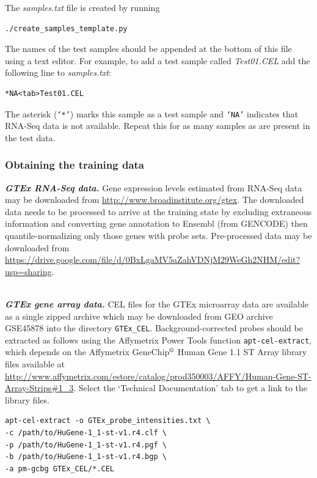 \documentclass[a4paper,12pt]{article}
\begin{document}
The \textit{samples.txt} file is created by running

\begin{verbatim}
./create_samples_template.py
\end{verbatim} 

The names of the test samples should be appended at the bottom of this file using a text editor. For example, to add a test sample called \textit{Test01.CEL} add the following line to \textit{samples.txt}:

\begin{verbatim}
*NA<tab>Test01.CEL
\end{verbatim}

The asterisk (\texttt{`*'}) marks this sample as a test sample and \texttt{`NA'} indicates that RNA-Seq data is not available. Repeat this for as many samples as are present in the test data.

\subsubsection{Obtaining the training data}
\label{usecase:training}

\textbf{\textit{GTEx RNA-Seq data.}} Gene expression levels estimated from RNA-Seq data may be downloaded from \url{http://www.broadinstitute.org/gtex}. The downloaded data needs to be processed to arrive at the training state by excluding extraneous information and converting gene annotation to Ensembl (from GENCODE) then quantile-normalizing only those genes with probe sets. Pre-processed data may be downloaded from \url{https://drive.google.com/file/d/0BxLgaMV5aZahVDNjM29WeGh2NHM/edit?usp=sharing}.

\noindent\\
\textbf{\textit{GTEx gene array data.}} CEL files for the GTEx microarray data are available as a single zipped archive which may be downloaded from GEO archive GSE45878 into the directory \texttt{GTEx\_CEL}. Background-corrected probes should be extracted as follows using the Affymetrix Power Tools function \texttt{apt-cel-extract}, which depends on the Affymetrix GeneChip$^{\text{\textregistered}}$ Human Gene 1.1 ST Array library files available at \url{http://www.affymetrix.com/estore/catalog/prod350003/AFFY/Human-Gene-ST-Array-Strips#1_3}. Select the `Technical Documentation' tab to get a link to the library files.

\begin{verbatim}
apt-cel-extract -o GTEx_probe_intensities.txt \
-c /path/to/HuGene-1_1-st-v1.r4.clf \
-p /path/to/HuGene-1_1-st-v1.r4.pgf \
-b /path/to/HuGene-1_1-st-v1.r4.bgp \
-a pm-gcbg GTEx_CEL/*.CEL
\end{verbatim}
\end{document}
